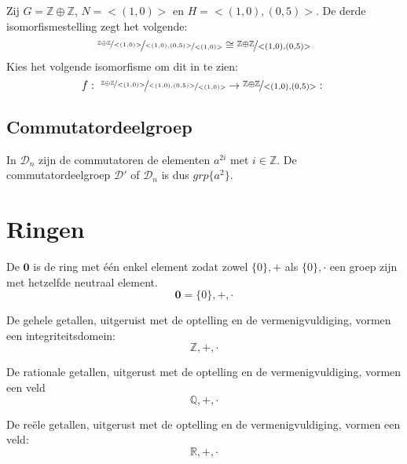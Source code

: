 \documentclass[main.tex]{subfiles}
\begin{document}
\begin{vb}
  Zij $G = \mathbb{Z} \oplus \mathbb{Z}$, $N = <(1,0)>$ en $H=<(1,0),(0,5)>$.
  De derde isomorfismestelling zegt het volgende:
  \[
  \nicefrac{\nicefrac{\mathbb{Z} \oplus \mathbb{Z}}{<(1,0)>}}{\nicefrac{<(1,0),(0,5)>}{<(1,0)>}} \cong \nicefrac{\mathbb{Z} \oplus \mathbb{Z}}{<(1,0),(0,5)>}
  \]
  Kies het volgende isomorfisme om dit in te zien:
  \[ f:\ \nicefrac{\nicefrac{\mathbb{Z} \oplus \mathbb{Z}}{<(1,0)>}}{\nicefrac{<(1,0),(0,5)>}{<(1,0)>}} \rightarrow \nicefrac{\mathbb{Z} \oplus \mathbb{Z}}{<(1,0),(0,5)>}:\ \]
\end{vb}


\subsection{Commutatordeelgroep}

\begin{vb}
  In $\mathcal{D}_{n}$ zijn de commutatoren de elementen $a^{2i}$ met $i\in\mathbb{Z}$.
  De commutatordeelgroep $\mathcal{D}'$ of $\mathcal{D}_{n}$ is dus $grp\{a^{2}\}$.
\end{vb}



\section{Ringen}
\label{sec:ringen}

\begin{de}
  De  $\boldsymbol{0}$ is de ring met \'e\'en enkel element zodat zowel $\{0\},+$ als $\{0\},\cdot$ een groep zijn met hetzelfde neutraal element.
  \[ \boldsymbol{0} = \{0\},+,\cdot \]
  \commj {}
\end{de}

\begin{vb}
  De gehele getallen, uitgeruist met de optelling en de vermenigvuldiging, vormen een integriteitsdomein:
  \[ \mathbb{Z},+,\cdot \]
  \commj {} \domein
\end{vb}

\begin{vb}
  De rationale getallen, uitgerust met de optelling en de vermenigvuldiging, vormen een veld 
  \[ \mathbb{Q},+,\cdot \]
\commj {} \domein \lichaam \veld
\end{vb}

\begin{vb}
  De re\"ele getallen, uitgerust met de optelling en de vermenigvuldiging, vormen een veld:
  \[ \mathbb{R},+,\cdot \]
\commj {} \domein \lichaam \veld
\end{vb}
\end{document}
